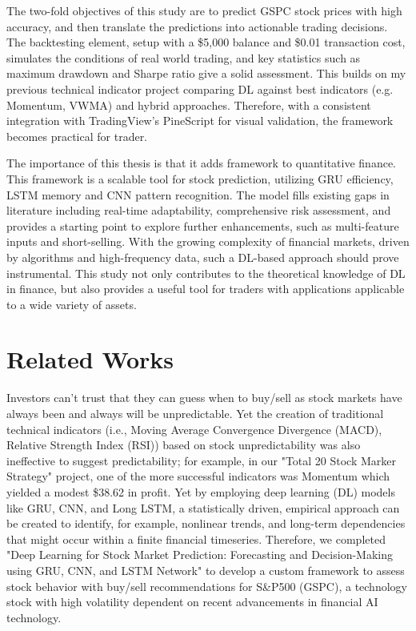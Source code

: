 The two-fold objectives of this study are to predict GSPC stock prices with high accuracy, and then translate the predictions into actionable trading decisions. The backtesting element, setup with a \$5,000 balance and \$0.01 transaction cost, simulates the conditions of real world trading, and key statistics such as maximum drawdown and Sharpe ratio give a solid assessment. This builds on my previous technical indicator project comparing DL against best indicators (e.g. Momentum, VWMA) and hybrid approaches. Therefore, with a consistent integration with TradingView’s PineScript for visual validation, the framework becomes practical for trader.

The importance of this thesis is that it adds framework to quantitative finance. This framework is a scalable tool for stock prediction, utilizing GRU efficiency, LSTM memory and CNN pattern recognition. The model fills existing gaps in literature including real-time adaptability, comprehensive risk assessment, and provides a starting point to explore further enhancements, such as multi-feature inputs and short-selling. With the growing complexity of financial markets, driven by algorithms and high-frequency data, such a DL-based approach should prove instrumental. This study not only contributes to the theoretical knowledge of DL in finance, but also provides a useful tool for traders with applications applicable to a wide variety of assets.

\section{Related Works}

Investors can't trust that they can guess when to buy/sell as stock markets have always been and always will be unpredictable. Yet the creation of traditional technical indicators (i.e., Moving Average Convergence Divergence (MACD), Relative Strength Index (RSI)) based on stock unpredictability was also ineffective to suggest predictability; for example, in our "Total 20 Stock Marker Strategy" project, one of the more successful indicators was Momentum which yielded a modest \$38.62 in profit. Yet by employing deep learning (DL) models like GRU, CNN, and Long LSTM, a statistically driven, empirical approach can be created to identify, for example, nonlinear trends, and long-term dependencies that might occur within a finite financial timeseries. Therefore, we completed "Deep Learning for Stock Market Prediction: Forecasting and
Decision-Making using GRU, CNN, and LSTM Network" to develop a custom framework to assess stock behavior with buy/sell recommendations for S\&P500 (GSPC), a technology stock with high volatility dependent on recent advancements in financial AI technology.

